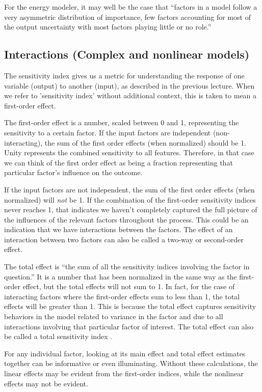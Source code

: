 \documentclass[10pt]{article}
\begin{document}
For the energy modeler, it may well be the case that ``factors in a model follow a very asymmetric distribution of importance, few factors accounting for most of the output uncertainty with most factors playing little or no role.'' \cite{Saltelli2004-ga}

\subsection{Interactions (Complex and nonlinear models)}

    The sensitivity index gives us a metric for understanding the response of one variable (output) to another (input), as described in the previous lecture. When we refer to 'sensitivity index' without additional context, this is taken to mean a first-order effect.

The first-order effect is a number, scaled between 0 and 1, representing the sensitivity to a certain factor. If the input factors are independent (non-interacting), the sum of the first order effects (when normalized) should be 1. Unity represents the combined sensitivity to all features. Therefore, in that case we can think of the first order effect as being a fraction representing that particular factor's influence on the outcome.

If the input factors are not independent, the sum of the first order effects (when normalized) will \textit{not} be 1. If the combination of the first-order sensitivity indices never reaches 1, that indicates we haven't completely captured the full picture of the influences of the relevant factors throughout the process. This could be an indication that we have interactions between the factors. The effect of an interaction between two factors can also be called a two-way or second-order effect.

The total effect is ``the sum of all the sensitivity indices involving the factor in question.'' \cite{Saltelli2009-tz} It is a number that has been normalized in the same way as the first-order effect, but the total effects will not sum to 1. In fact, for the case of interacting factors where the first-order effects sum to less than 1, the total effects will be greater than 1. This is because the total effect captures sensitivity behaviors in the model related to variance in the factor and due to all interactions involving that particular factor of interest. The total effect can also be called a total sensitivity index \cite{Saltelli2009-tz}.

For any individual factor, looking at its main effect and total effect estimates together can be informative or even illuminating. Without these calculations, the linear effects may be evident from the first-order indices, while the nonlinear effects may not be evident.
\end{document}
